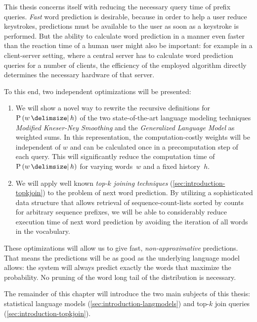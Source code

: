 This thesis concerns itself with reducing the necessary query time of prefix
queries.
\emph{Fast} word prediction is desirable, because in order to help a user reduce
keystrokes, predictions must be available to the user as soon as a keystroke
is performed.
But the ability to calculate word prediction in a manner even faster than the
reaction time of a human user might also be important:
for example in a client-server setting, where a central server has to calculate
word prediction queries for a number of clients, the efficiency of the employed
algorithm directly determines the necessary hardware of that server.

To this end, two independent optimizations will be presented:
\begin{enumerate}
  \item We will show a novel way to rewrite the recursive definitions for
    $\Prob{w}{h}$ of the two state-of-the-art language modeling techniques
    \emph{Modified Kneser-Ney Smoothing} and the \emph{Generalized Language
    Model} as weighted sums.
    In this representation, the com\-pu\-ta\-tion-costly weights will be
    independent of $w$ and can be calculated once in a precomputation step of
    each query.
    This will significantly reduce the computation time of $\Prob{w}{h}$ for
    varying words~$w$ and a fixed history~$h$.
  \item We will apply well known \emph{top-$k$ joining techniques}
    (\cref{sec:introduction-topkjoin}) to the problem of next word prediction.
    By utilizing a sophisticated data structure that allows retrieval of
    sequence-count-lists sorted by counts for arbitrary sequence prefixes,
    we will be able to considerably reduce execution time of next word
    prediction by avoiding the iteration of all words in the vocabulary.
\end{enumerate}

These optimizations will allow us to give fast, \emph{non-approximative}
predictions.
That means the predictions will be as good as the underlying language model
allows: the system will always predict exactly the words that maximize the
probability.
No pruning of the word long tail of the distribution is necessary.

The remainder of this chapter will introduce the two main subjects of this
thesis: statistical language models (\cref{sec:introduction-langmodels}) and
top-$k$ join queries (\cref{sec:introduction-topkjoin}).


